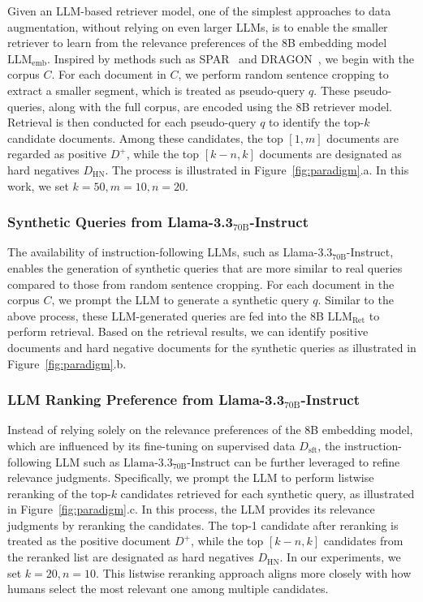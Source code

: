 \documentclass[]{fairmeta}
\begin{document}
Given an LLM-based retriever model, one of the simplest approaches to data augmentation, without relying on even larger LLMs, is to enable the smaller retriever to learn from the relevance preferences of the 8B embedding model $\text{LLM}_{\text{emb}}$.
Inspired by methods such as SPAR~\citep{chen-etal-2022-salient} and DRAGON~\citep{lin-etal-2023-train}, we begin with the corpus $C$.
For each document in $C$, we perform random sentence cropping to extract a smaller segment, which is treated as pseudo-query $q$.
These pseudo-queries, along with the full corpus, are encoded using the 8B retriever model.
Retrieval is then conducted for each pseudo-query $q$ to identify the top-$k$ candidate documents.
Among these candidates, the top $[1, m]$ documents are regarded as positive $D^+$, while the top $[k-n, k]$ documents are designated as hard negatives $D_{\text{HN}}$.
The process is illustrated in Figure~\ref{fig:paradigm}.a.
In this work, we set $k=50, m=10, n=20$.

\subsubsection{Synthetic Queries from \texorpdfstring{Llama-3.3$_\text{70B}$-Instruct}{Llama-3.3-70B-Instruct}}

The availability of instruction-following LLMs, such as Llama-3.3$_\text{70B}$-Instruct, enables the generation of synthetic queries that are more similar to real queries compared to those from random sentence cropping.
For each document in the corpus $C$, we prompt the LLM to generate a synthetic query $q$.
Similar to the above process, these LLM-generated queries are fed into the 8B $\text{LLM}_{\text{Ret}}$ to perform retrieval.
Based on the retrieval results, we can identify positive documents and hard negative documents for the synthetic queries as illustrated in Figure~\ref{fig:paradigm}.b.

\subsubsection{LLM Ranking Preference from \texorpdfstring{Llama-3.3$_\text{70B}$-Instruct}{Llama-3.3-70B-Instruct}}
Instead of relying solely on the relevance preferences of the 8B embedding model, which are influenced by its fine-tuning on supervised data $D_{\text{sft}}$, the instruction-following LLM such as $\text{Llama-3.3}_{\text{70B}}$-Instruct can be further leveraged to refine relevance judgments.
Specifically, we prompt the LLM to perform listwise reranking of the top-$k$ candidates retrieved for each synthetic query, as illustrated in Figure~\ref{fig:paradigm}.c.
In this process, the LLM provides its relevance judgments by reranking the candidates.
The top-1 candidate after reranking is treated as the positive document $D^+$, while the top $[k-n, k]$ candidates from the reranked list are designated as hard negatives $D_{\text{HN}}$.
In our experiments, we set $k=20, n=10$.
This listwise reranking approach aligns more closely with how humans select the most relevant one among multiple candidates.
\end{document}
